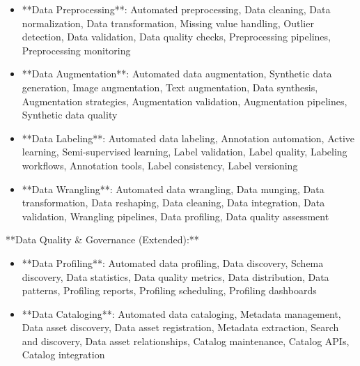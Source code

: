 \documentclass[11pt,a4paper]{article}
\begin{document}
\begin{itemize}
\item **Data Preprocessing**: Automated preprocessing, Data cleaning, Data normalization, Data transformation, Missing value handling, Outlier detection, Data validation, Data quality checks, Preprocessing pipelines, Preprocessing monitoring
\end{itemize}

\begin{itemize}
\item **Data Augmentation**: Automated data augmentation, Synthetic data generation, Image augmentation, Text augmentation, Data synthesis, Augmentation strategies, Augmentation validation, Augmentation pipelines, Synthetic data quality
\end{itemize}

\begin{itemize}
\item **Data Labeling**: Automated data labeling, Annotation automation, Active learning, Semi-supervised learning, Label validation, Label quality, Labeling workflows, Annotation tools, Label consistency, Label versioning
\end{itemize}

\begin{itemize}
\item **Data Wrangling**: Automated data wrangling, Data munging, Data transformation, Data reshaping, Data cleaning, Data integration, Data validation, Wrangling pipelines, Data profiling, Data quality assessment
\end{itemize}

**Data Quality \& Governance (Extended):**

\begin{itemize}
\item **Data Profiling**: Automated data profiling, Data discovery, Schema discovery, Data statistics, Data quality metrics, Data distribution, Data patterns, Profiling reports, Profiling scheduling, Profiling dashboards
\end{itemize}

\begin{itemize}
\item **Data Cataloging**: Automated data cataloging, Metadata management, Data asset discovery, Data asset registration, Metadata extraction, Search and discovery, Data asset relationships, Catalog maintenance, Catalog APIs, Catalog integration
\end{itemize}
\end{document}
